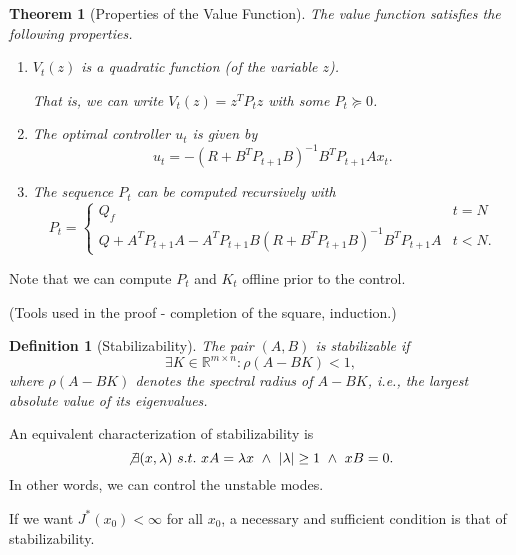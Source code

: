\documentclass[a4 paper]{article}
\numberwithin{equation}{section}
\theoremstyle{boldStyle}
\theoremstyle{boldBlueStyle}
\theoremstyle{boldPurpleStyle}
\newtheorem{theorem}{Theorem}[section]
\theoremstyle{boldRedStyle}
\newtheorem{definition}{Definition}[section]
\begin{document}
\begin{theorem}[Properties of the Value Function]
The value function satisfies the following properties.
\begin{enumerate}
    \item \( V_t(z) \) is a quadratic function (of the variable \( z \)). 
    
    That is, we can write \( V_t(z) = z^T P_t z \) with some \( P_t \succeq 0 \).
    
    \item The optimal controller \( u_t \) is given by
    \[
    u_t = -(R + B^T P_{t+1} B)^{-1} B^T P_{t+1} A x_t.
    \]
    \item The sequence \( P_t \) can be computed recursively with
    \[
    P_t = 
    \begin{cases} 
    Q_f & t = N \\
    Q + A^T P_{t+1} A - A^T P_{t+1} B (R + B^T P_{t+1} B)^{-1} B^T P_{t+1} A & t < N.
    \end{cases}
    \]
\end{enumerate}
\end{theorem}

Note that we can compute \( P_t \) and \( K_t \) offline prior to the control.

(Tools used in the proof - completion of the square, induction.)


\begin{definition}[Stabilizability]
The pair \( (A, B) \) is \textit{stabilizable} if
\[
\exists K \in \mathbb{R}^{m \times n} : \rho(A - BK) < 1,
\]
where \( \rho(A - BK) \) denotes the spectral radius of \( A - BK \), i.e., the largest absolute value of its eigenvalues.
\end{definition}

An equivalent characterization of stabilizability is
\[
\not\exists (x, \lambda) \ s.t. \ xA = \lambda x \ \land \ |\lambda| \ge 1 \ \land \ xB = 0.
\]
In other words, we can control the unstable modes. 

If we want \( J^*(x_0) < \infty \) for all \( x_0 \), a necessary and sufficient condition is that of stabilizability.










\newpage
\end{document}
